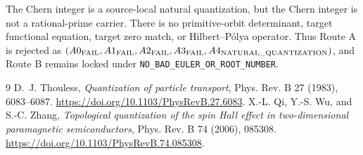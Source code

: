 \documentclass[10pt]{article}
\begin{document}
The Chern integer is a source-local natural quantization, but the Chern integer
is not a rational-prime carrier.  There is no primitive-orbit determinant,
target functional equation, target zero match, or Hilbert--P\'olya operator.
Thus Route A is rejected as
$(A0_{\rm FAIL},A1_{\rm FAIL},A2_{\rm FAIL},A3_{\rm FAIL},
A4_{\rm NATURAL\_QUANTIZATION})$, and Route B remains locked under
\texttt{NO\_BAD\_EULER\_OR\_ROOT\_NUMBER}.

\begin{thebibliography}{9}
\small
{}
D.~J. Thouless, \emph{Quantization of particle transport}, Phys. Rev. B 27
(1983), 6083--6087. \url{https://doi.org/10.1103/PhysRevB.27.6083}.
X.-L. Qi, Y.-S. Wu, and S.-C. Zhang, \emph{Topological quantization of the
spin Hall effect in two-dimensional paramagnetic semiconductors}, Phys. Rev.
B 74 (2006), 085308. \url{https://doi.org/10.1103/PhysRevB.74.085308}.
\end{thebibliography}
\fi
\end{document}
